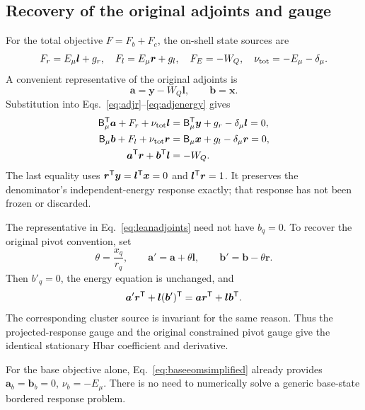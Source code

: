 \subsection{Recovery of the original adjoints and gauge}
For the total objective $F=F_b+F_c$, the on-shell state sources are
\begin{equation}
 F_r=E_\mu\bm l+g_r,\quad F_l=E_\mu\bm r+g_l,
 \quad F_E=-W_Q,
 \quad \nu_{\rm tot}=-E_\mu-\delta_\mu.
 \label{eq:leantotalsources}
\end{equation}
A convenient representative of the original adjoints is
\begin{equation}
 \bm a=\bm y-W_Q\bm l,\qquad \bm b=\bm x.
 \label{eq:leanadjoints}
\end{equation}
Substitution into Eqs.~\eqref{eq:adjr}--\eqref{eq:adjenergy} gives
\begin{align}
 \mathsf B_\mu^{\mathsf T}\bm a+F_r+\nu_{\rm tot}\bm l
 &=\mathsf B_\mu^{\mathsf T}\bm y+g_r-\delta_\mu\bm l=0,\\
 \mathsf B_\mu\bm b+F_l+\nu_{\rm tot}\bm r
 &=\mathsf B_\mu\bm x+g_l-\delta_\mu\bm r=0,\\
 \bm a^{\mathsf T}\bm r+\bm b^{\mathsf T}\bm l&=-W_Q.
 \label{eq:leanadjointproof}
\end{align}
The last equality uses $\bm r^{\mathsf T}\bm y=\bm l^{\mathsf T}\bm x=0$ and
$\bm l^{\mathsf T}\bm r=1$. It preserves the denominator's independent-energy
response exactly; that response has not been frozen or discarded.

The representative in Eq.~\eqref{eq:leanadjoints} need not have $b_q=0$.
To recover the original pivot convention, set
\begin{equation}
 \theta=\frac{x_q}{r_q},\qquad
 \bm a'=\bm a+\theta\bm l,\qquad
 \bm b'=\bm b-\theta\bm r.
 \label{eq:leanpivot}
\end{equation}
Then $b'_q=0$, the energy equation is unchanged, and
\begin{equation}
 \bm a'\bm r^{\mathsf T}+\bm l(\bm b')^{\mathsf T}
 =\bm a\bm r^{\mathsf T}+\bm l\bm b^{\mathsf T}.
\end{equation}
The corresponding cluster source is invariant for the same reason. Thus
the projected-response gauge and the original constrained pivot gauge give
the identical stationary Hbar coefficient and derivative.

For the base objective alone, Eq.~\eqref{eq:baseeomsimplified} already
provides $\bm a_b=\bm b_b=0$, $\nu_b=-E_\mu$. There is no need to
numerically solve a generic base-state bordered response problem.


